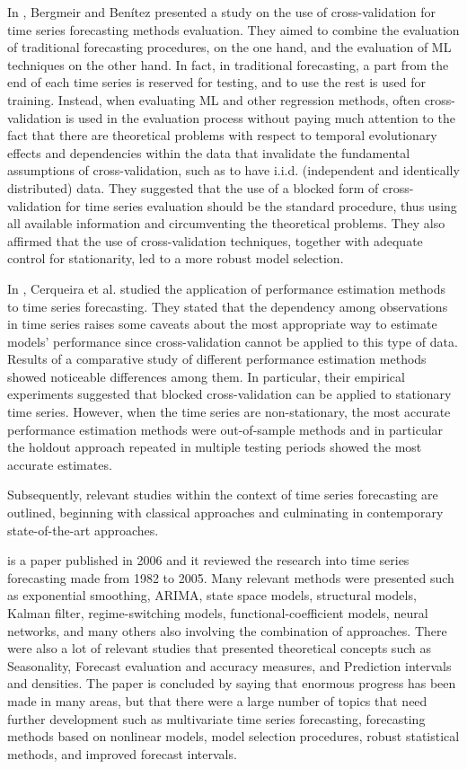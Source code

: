 In \cite{BERGMEIR2012192}, Bergmeir and Benítez presented a study on the use of cross-validation for time series forecasting methods evaluation.
They aimed to combine the evaluation of traditional forecasting procedures, on the one hand, and the evaluation of ML techniques on the other hand.
In fact, in traditional forecasting, a part from the end of each time series is reserved for testing, and to use the rest is used for training.
Instead, when evaluating ML and other regression methods, often cross-validation is used in the evaluation process without paying much attention to the fact that there are theoretical problems with respect to temporal evolutionary effects and dependencies within the data that invalidate the fundamental assumptions of cross-validation, such as to have i.i.d. (independent and identically distributed) data.
They suggested that the use of a blocked form of cross-validation for time series evaluation should be the standard procedure, thus using all available information and circumventing the theoretical problems.
They also affirmed that the use of cross-validation techniques, together with adequate control for stationarity, led to a more robust model selection.

In \cite{Cerqueira2020}, Cerqueira et al. studied the application of performance estimation methods to time series forecasting.
They stated that the dependency among observations in time series raises some caveats about the most appropriate way to estimate models’ performance since cross-validation cannot be applied to this type of data.
Results of a comparative study of different performance estimation methods showed noticeable differences among them.
In particular, their empirical experiments suggested that blocked cross-validation can be applied to stationary time series.
However, when the time series are non-stationary, the most accurate performance estimation methods were out-of-sample methods and in particular the holdout approach repeated in multiple testing periods showed the most accurate estimates.

Subsequently, relevant studies within the context of time series forecasting are outlined, beginning with classical approaches and culminating in contemporary state-of-the-art approaches.

\cite{DEGOOIJER2006443} is a paper published in 2006 and it reviewed the research into time series forecasting made from 1982 to 2005.
Many relevant methods were presented such as exponential smoothing, ARIMA, state space models, structural models, Kalman filter, regime-switching models, functional-coefficient models, neural networks, and many others also involving the combination of approaches.
There were also a lot of relevant studies that presented theoretical concepts such as Seasonality, Forecast evaluation and accuracy measures, and Prediction intervals and densities.
The paper is concluded by saying that enormous progress has been made in many areas, but that there were a large number of topics that need further development such as multivariate time series forecasting, forecasting methods based on nonlinear models, model selection procedures, robust statistical methods, and improved forecast intervals.


